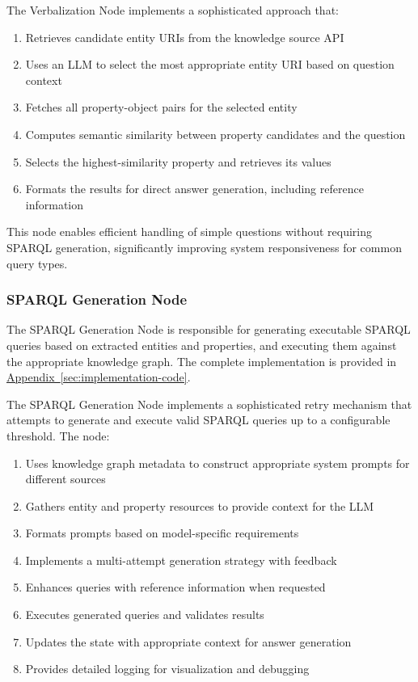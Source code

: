 The Verbalization Node implements a sophisticated approach that:
\begin{enumerate}
    \item Retrieves candidate entity URIs from the knowledge source API
    \item Uses an LLM to select the most appropriate entity URI based on question context
    \item Fetches all property-object pairs for the selected entity
    \item Computes semantic similarity between property candidates and the question
    \item Selects the highest-similarity property and retrieves its values
    \item Formats the results for direct answer generation, including reference information
\end{enumerate}

This node enables efficient handling of simple questions without requiring SPARQL generation, significantly improving system responsiveness for common query types.

\subsubsection{SPARQL Generation Node}
The SPARQL Generation Node is responsible for generating executable SPARQL queries based on extracted entities and properties, and executing them against the appropriate knowledge graph. The complete implementation is provided in \hyperref[code:sparql-generation-node]{Appendix~\ref{sec:implementation-code}}.

The SPARQL Generation Node implements a sophisticated retry mechanism that attempts to generate and execute valid SPARQL queries up to a configurable threshold. The node:

\begin{enumerate}
    \item Uses knowledge graph metadata to construct appropriate system prompts for different sources
    \item Gathers entity and property resources to provide context for the LLM
    \item Formats prompts based on model-specific requirements
    \item Implements a multi-attempt generation strategy with feedback
    \item Enhances queries with reference information when requested
    \item Executes generated queries and validates results
    \item Updates the state with appropriate context for answer generation
    \item Provides detailed logging for visualization and debugging
\end{enumerate}

